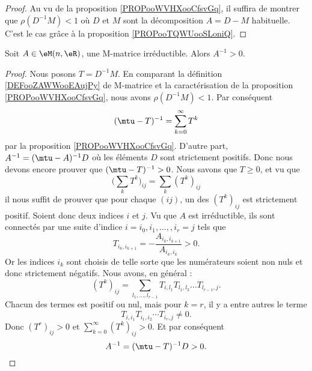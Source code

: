 \begin{proof}
    Au vu de la proposition \ref{PROPooWVHXooCfsvGq}, il suffira de montrer que \( \rho(D^{-1}M)<1\) où \( D\) et \( M\) sont la décomposition \( A=D-M\) habituelle. C'est le cas grâce à la proposition \ref{PROPooTQWUooSLoniQ}.
\end{proof}

\begin{proposition}     \label{PROPooZDMQooIZAbKK}
    Soit \( A\in \eM(n,\eR)\), une M-matrice irréductible. Alors \( A^{-1}>0\).
\end{proposition}

\begin{proof}
    Nous posons \( T=D^{-1}M\). En comparant la définition \ref{DEFooZAWWooEAujPy} de M-matrice et la caractérisation de la proposition \ref{PROPooWVHXooCfsvGq}, nous avons \( \rho(D^{-1}M)<1\). Par conséquent 
    \begin{equation}
        (\mtu-T)^{-1}=\sum_{k=0}^{\infty}T^k
    \end{equation}
    par la proposition \ref{PROPooWVHXooCfsvGq}. D'autre part, \( A^{-1}=(\mtu-A)^{-1}D\) où les éléments \( D\) sont strictement positifs. Donc nous devons encore prouver que \( (\mtu-T)^{-1}>0\). Nous savons que \( T\geq 0\), et vu que
    \begin{equation}
        \big(\sum_kT^k)_{ij}=\sum_k(T^k)_{ij}
    \end{equation}
    il nous suffit de prouver que pour chaque \( (ij)\), un des \( (T^k)_{ij}\) est strictement positif. Soient donc deux indices \( i\) et \( j\). Vu que \( A\) est irréductible, ils sont connectés par une suite d'indice $i=i_0,i_1,\ldots, ,i_r=j$ tels que 
    \begin{equation}
        T_{i_k,i_{k+1}}=-\frac{ A_{i_k,i_{k+1}} }{ A_{i_k,i_k} }>0.
    \end{equation}
    Or les indices \( i_k\) sont choisis de telle sorte que les numérateurs soient non nuls et donc strictement négatifs. Nous avons, en général :
    \begin{equation}
        (T^k)_{ij}=\sum_{l_1,\ldots, l_{r-1}}T_{i,l_1}T_{l_1,l_2}\ldots T_{l_{r-1},j}.
    \end{equation}
    Chacun des termes est positif ou nul, mais pour \( k=r\), il y a entre autres le terme
    \begin{equation}
        T_{i,i_1}T_{i_1,i_2}\cdots T_{i_r,j}\neq 0.
    \end{equation}
    Donc \( (T^r)_{ij}>0\) et \( \sum_{k=0}^{\infty}(T^k)_{ij}>0\). Et par conséquent 
    \begin{equation}
        A^{-1}=(\mtu-T)^{-1}D>0.
    \end{equation}
\end{proof}

